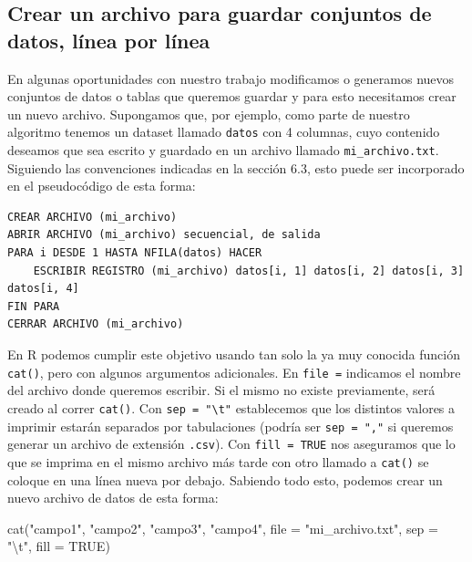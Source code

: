 \documentclass[
]{book}
\newenvironment{Shaded}{\begin{snugshade}}{\end{snugshade}}
\newcommand{\AttributeTok}[1]{\textcolor[rgb]{0.77,0.63,0.00}{#1}}
\newcommand{\ConstantTok}[1]{\textcolor[rgb]{0.00,0.00,0.00}{#1}}
\newcommand{\FunctionTok}[1]{\textcolor[rgb]{0.00,0.00,0.00}{#1}}
\newcommand{\NormalTok}[1]{#1}
\newcommand{\SpecialCharTok}[1]{\textcolor[rgb]{0.00,0.00,0.00}{#1}}
\newcommand{\StringTok}[1]{\textcolor[rgb]{0.31,0.60,0.02}{#1}}
\begin{document}
\hypertarget{crear-un-archivo-para-guardar-conjuntos-de-datos-luxednea-por-luxednea}{%
\subsection{Crear un archivo para guardar conjuntos de datos, línea por línea}\label{crear-un-archivo-para-guardar-conjuntos-de-datos-luxednea-por-luxednea}}

En algunas oportunidades con nuestro trabajo modificamos o generamos nuevos conjuntos de datos o tablas que queremos guardar y para esto necesitamos crear un nuevo archivo. Supongamos que, por ejemplo, como parte de nuestro algoritmo tenemos un dataset llamado \texttt{datos} con 4 columnas, cuyo contenido deseamos que sea escrito y guardado en un archivo llamado \texttt{mi\_archivo.txt}. Siguiendo las convenciones indicadas en la sección 6.3, esto puede ser incorporado en el pseudocódigo de esta forma:

\begin{verbatim}
CREAR ARCHIVO (mi_archivo)
ABRIR ARCHIVO (mi_archivo) secuencial, de salida
PARA i DESDE 1 HASTA NFILA(datos) HACER
    ESCRIBIR REGISTRO (mi_archivo) datos[i, 1] datos[i, 2] datos[i, 3] datos[i, 4]
FIN PARA
CERRAR ARCHIVO (mi_archivo)
\end{verbatim}

En R podemos cumplir este objetivo usando tan solo la ya muy conocida función \texttt{cat()}, pero con algunos argumentos adicionales. En \texttt{file\ =} indicamos el nombre del archivo donde queremos escribir. Si el mismo no existe previamente, será creado al correr \texttt{cat()}. Con \texttt{sep\ =\ "\textbackslash{}t"} establecemos que los distintos valores a imprimir estarán separados por tabulaciones (podría ser \texttt{sep\ =\ ","} si queremos generar un archivo de extensión \texttt{.csv}). Con \texttt{fill\ =\ TRUE} nos aseguramos que lo que se imprima en el mismo archivo más tarde con otro llamado a \texttt{cat()} se coloque en una línea nueva por debajo. Sabiendo todo esto, podemos crear un nuevo archivo de datos de esta forma:

\begin{Shaded}
\begin{Highlighting}[]
\FunctionTok{cat}\NormalTok{(}\StringTok{"campo1"}\NormalTok{, }\StringTok{"campo2"}\NormalTok{, }\StringTok{"campo3"}\NormalTok{, }\StringTok{"campo4"}\NormalTok{, }\AttributeTok{file =} \StringTok{"mi\_archivo.txt"}\NormalTok{, }\AttributeTok{sep =} \StringTok{"}\SpecialCharTok{\textbackslash{}t}\StringTok{"}\NormalTok{, }\AttributeTok{fill =} \ConstantTok{TRUE}\NormalTok{)}
\end{Highlighting}
\end{Shaded}
\end{document}
